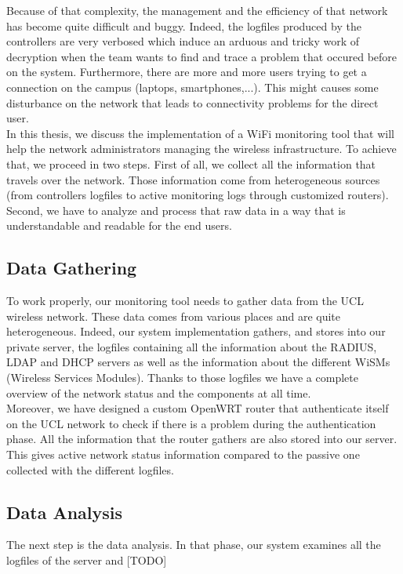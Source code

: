Because of that complexity, the management and the efficiency of that network has become quite difficult and buggy. Indeed, the logfiles produced by the controllers are very verbosed which induce an arduous and tricky work of decryption when the team wants to find and trace a problem that occured before on the system. Furthermore, there are more and more users trying to get a connection on the campus (laptops, smartphones,...). This might causes some disturbance on the network that leads to connectivity problems for the direct user.\\

In this thesis, we discuss the implementation of a WiFi monitoring tool that will help the network administrators managing the wireless infrastructure. To achieve that, we proceed in two steps. First of all, we collect all the information that travels over the network. Those information come from heterogeneous sources (from controllers logfiles to active monitoring logs through customized routers). Second, we have to analyze and process that raw data in a way that is understandable and readable for the end users.

\subsection{Data Gathering}

To work properly, our monitoring tool needs to gather data from the UCL wireless network. These data comes from various places and are quite heterogeneous. Indeed, our system implementation gathers, and stores into our private server, the logfiles containing all the information about the RADIUS, LDAP and DHCP servers as well as the information about the different WiSMs (Wireless Services Modules). Thanks to those logfiles we have a complete overview of the network status and the components at all time.\\

Moreover, we have designed a custom OpenWRT router that authenticate itself on the UCL network to check if there is a problem during the authentication phase. All the information that the router gathers are also stored into our server. This gives active network status information compared to the passive one collected with the different logfiles.


\subsection{Data Analysis}
The next step is the data analysis. In that phase, our system examines all the logfiles of the server and [TODO]




